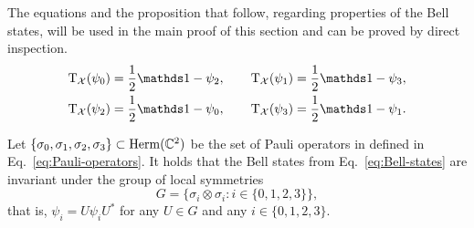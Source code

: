 The equations and the proposition that follow, regarding properties of the Bell states, will 
be used in the main proof of this section and can be proved by direct inspection.
\begin{equation}
  \label{eq:ppt-bell-states}
  \begin{aligned}
    \pt_{\X}(\psi_{0}) = \frac{1}{2}\I - \psi_{2},\qquad
    \pt_{\X}(\psi_{1}) = \frac{1}{2}\I - \psi_{3},\\
    \pt_{\X}(\psi_{2}) = \frac{1}{2}\I - \psi_{0},\qquad
    \pt_{\X}(\psi_{3}) = \frac{1}{2}\I - \psi_{1}.
  \end{aligned}
\end{equation}
\begin{prop}
\label{prop:groupG}
Let $\{\sigma_{0}, \sigma_{1}, \sigma_{2}, \sigma_{3}\} \subset \mathrm{Herm}(\mathbb{C}^{2})$ 
be the set of Pauli operators in defined in Eq.~\eqref{eq:Pauli-operators}.
It holds that the Bell states from Eq.~\eqref{eq:Bell-states} are invariant under the group of local symmetries
\begin{equation}
  G = \big\{ \sigma_{i} \otimes \sigma_{i} : i\in\{0,1,2,3\}  \big\},
\end{equation}
that is, $\psi_{i} = U\psi_{i}U^{*}$ for any $U \in G$ and any $i\in\{0,1,2,3\}$.
\end{prop}

